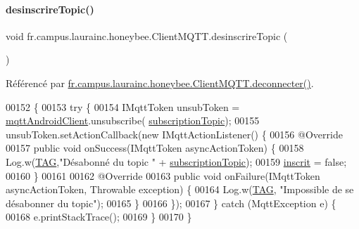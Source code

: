 \paragraph{\texorpdfstring{desinscrire\+Topic()}{desinscrireTopic()}}
{\footnotesize\ttfamily void fr.\+campus.\+laurainc.\+honeybee.\+Client\+M\+Q\+T\+T.\+desinscrire\+Topic (\begin{DoxyParamCaption}{ }\end{DoxyParamCaption})}



Référencé par \hyperlink{classfr_1_1campus_1_1laurainc_1_1honeybee_1_1_client_m_q_t_t_af067ec55e00ec18a14e248279872242f}{fr.\+campus.\+laurainc.\+honeybee.\+Client\+M\+Q\+T\+T.\+deconnecter()}.


\begin{DoxyCode}
00152                                    \{
00153         \textcolor{keywordflow}{try} \{
00154             IMqttToken unsubToken = \hyperlink{classfr_1_1campus_1_1laurainc_1_1honeybee_1_1_client_m_q_t_t_a587a9b6c785448cf3e37dc92bcac7961}{mqttAndroidClient}.unsubscribe(
      \hyperlink{classfr_1_1campus_1_1laurainc_1_1honeybee_1_1_client_m_q_t_t_a8771380740ea2e139b595f5b8fa7e0a5}{subscriptionTopic});
00155             unsubToken.setActionCallback(\textcolor{keyword}{new} IMqttActionListener() \{
00156                 @Override
00157                 \textcolor{keyword}{public} \textcolor{keywordtype}{void} onSuccess(IMqttToken asyncActionToken) \{
00158                     Log.w(\hyperlink{classfr_1_1campus_1_1laurainc_1_1honeybee_1_1_client_m_q_t_t_a378324f705f8d7870c5f7be0cea02890}{TAG},\textcolor{stringliteral}{"Désabonné du topic "} + \hyperlink{classfr_1_1campus_1_1laurainc_1_1honeybee_1_1_client_m_q_t_t_a8771380740ea2e139b595f5b8fa7e0a5}{subscriptionTopic});
00159                     \hyperlink{classfr_1_1campus_1_1laurainc_1_1honeybee_1_1_client_m_q_t_t_a774f2fd702c2a3581bf8dbfa341274fc}{inscrit} = \textcolor{keyword}{false};
00160                 \}
00161 
00162                 @Override
00163                 \textcolor{keyword}{public} \textcolor{keywordtype}{void} onFailure(IMqttToken asyncActionToken, Throwable exception) \{
00164                     Log.w(\hyperlink{classfr_1_1campus_1_1laurainc_1_1honeybee_1_1_client_m_q_t_t_a378324f705f8d7870c5f7be0cea02890}{TAG}, \textcolor{stringliteral}{"Impossible de se désabonner du topic"});
00165                 \}
00166             \});
00167         \} \textcolor{keywordflow}{catch} (MqttException e) \{
00168             e.printStackTrace();
00169         \}
00170     \}
\end{DoxyCode}
\mbox{\label{classfr_1_1campus_1_1laurainc_1_1honeybee_1_1_client_m_q_t_t_a06c30a7291f526d0bd9a47fccb3ac1ad}} 
